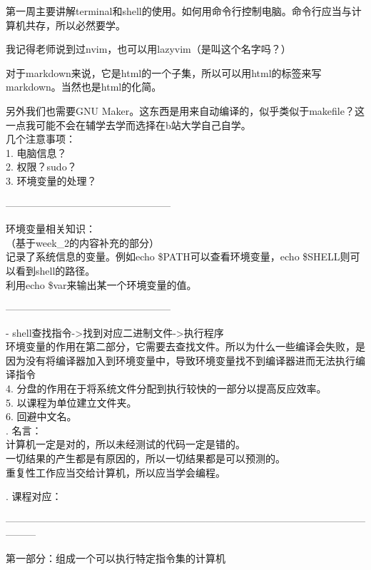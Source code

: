 \documentclass{article}
\begin{document}
第一周主要讲解terminal和shell的使用。如何用命令行控制电脑。命令行应当与计算机共存，所以必然要学。

我记得老师说到过nvim，也可以用lazyvim（是叫这个名字吗？）

对于markdown来说，它是html的一个子集，所以可以用html的标签来写markdown。当然也是html的化简。

另外我们也需要GNU Maker。这东西是用来自动编译的，似乎类似于makefile？这一点我可能不会在辅学去学而选择在b站大学自己自学。
\\

\noindent 几个注意事项：\\
1. 电脑信息？\\
2. 权限？sudo？\\
3. 环境变量的处理？\\
\begin{center}
    --------------------------------------------------
\end{center}
环境变量相关知识：\\
（基于week\_2的内容补充的部分）\\
记录了系统信息的变量。例如echo \$PATH可以查看环境变量，echo \$SHELL则可以看到shell的路径。\\
利用echo \$var来输出某一个环境变量的值。\\
\begin{center}
    --------------------------------------------------
\end{center}
- shell查找指令->找到对应二进制文件->执行程序\\
环境变量的作用在第二部分，它需要去查找文件。所以为什么一些编译会失败，是因为没有将编译器加入到环境变量中，导致环境变量找不到编译器进而无法执行编译指令\\
4. 分盘的作用在于将系统文件分配到执行较快的一部分以提高反应效率。\\
5. 以课程为单位建立文件夹。\\
6. 回避中文名。\\

. 名言：\\
计算机一定是对的，所以未经测试的代码一定是错的。\\
一切结果的产生都是有原因的，所以一切结果都是可以预测的。\\
重复性工作应当交给计算机，所以应当学会编程。

. 课程对应：

\begin{center}
    ———————————————————————————————————————
\end{center}
第一部分：组成一个可以执行特定指令集的计算机\\
\end{document}
